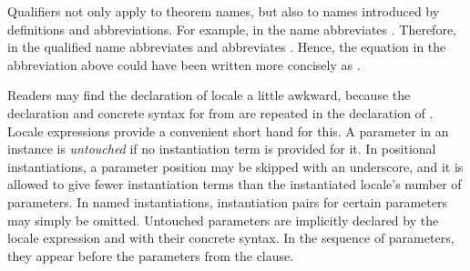 \begin{isabellebody}
\begin{isamarkuptext}
\begin{isabelle}
\end{isabelle}%
\end{isamarkuptext}%
\isamarkuptrue%
%
\begin{isamarkuptext}%
Qualifiers not only apply to theorem names, but also to names
  introduced by definitions and abbreviations.  For example, in  the name  abbreviates .  Therefore, in 
  the qualified name  abbreviates  and  abbreviates .  Hence, the equation in the abbreviation
  above could have been written more concisely as .%
\end{isamarkuptext}%
\isamarkuptrue%
%
\begin{isamarkuptext}%
Readers may find the declaration of locale  a little awkward, because the declaration and
  concrete syntax for  from  are
  repeated in the declaration of .  Locale
  expressions provide a convenient short hand for this.  A parameter
  in an instance is \emph{untouched} if no instantiation term is
  provided for it.  In positional instantiations, a parameter position
  may be skipped with an underscore, and it is allowed to give fewer
  instantiation terms than the instantiated locale's number of
  parameters.  In named instantiations, instantiation pairs for
  certain parameters may simply be omitted.  Untouched parameters are
  implicitly declared by the locale expression and with their concrete
  syntax.  In the sequence of parameters, they appear before the
  parameters from the  clause.


\end{isamarkuptext}
\end{isabellebody}
